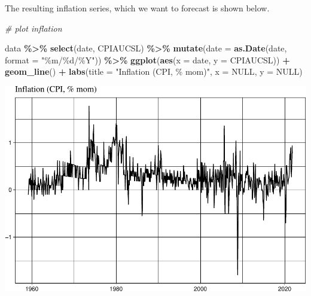 \documentclass[
]{article}
\newenvironment{Shaded}{\begin{snugshade}}{\end{snugshade}}
\newcommand{\AttributeTok}[1]{\textcolor[rgb]{0.13,0.29,0.53}{#1}}
\newcommand{\CommentTok}[1]{\textcolor[rgb]{0.56,0.35,0.01}{\textit{#1}}}
\newcommand{\ConstantTok}[1]{\textcolor[rgb]{0.56,0.35,0.01}{#1}}
\newcommand{\DecValTok}[1]{\textcolor[rgb]{0.00,0.00,0.81}{#1}}
\newcommand{\FunctionTok}[1]{\textcolor[rgb]{0.13,0.29,0.53}{\textbf{#1}}}
\newcommand{\NormalTok}[1]{#1}
\newcommand{\OtherTok}[1]{\textcolor[rgb]{0.56,0.35,0.01}{#1}}
\newcommand{\SpecialCharTok}[1]{\textcolor[rgb]{0.81,0.36,0.00}{\textbf{#1}}}
\newcommand{\StringTok}[1]{\textcolor[rgb]{0.31,0.60,0.02}{#1}}
\begin{document}
\begin{Shaded}
\end{Shaded}

The resulting inflation series, which we want to forecast is shown
below.

\begin{Shaded}
\begin{Highlighting}[]
\CommentTok{\# plot inflation}

\NormalTok{data }\SpecialCharTok{\%\textgreater{}\%}
    \FunctionTok{select}\NormalTok{(date, CPIAUCSL) }\SpecialCharTok{\%\textgreater{}\%}
    \FunctionTok{mutate}\NormalTok{(}\AttributeTok{date =} \FunctionTok{as.Date}\NormalTok{(date, }\AttributeTok{format =} \StringTok{"\%m/\%d/\%Y"}\NormalTok{)) }\SpecialCharTok{\%\textgreater{}\%}
    \FunctionTok{ggplot}\NormalTok{(}\FunctionTok{aes}\NormalTok{(}\AttributeTok{x =}\NormalTok{ date, }\AttributeTok{y =}\NormalTok{ CPIAUCSL)) }\SpecialCharTok{+} \FunctionTok{geom\_line}\NormalTok{() }\SpecialCharTok{+} \FunctionTok{labs}\NormalTok{(}\AttributeTok{title =} \StringTok{"Inflation (CPI, \% mom)"}\NormalTok{,}
    \AttributeTok{x =} \ConstantTok{NULL}\NormalTok{, }\AttributeTok{y =} \ConstantTok{NULL}\NormalTok{)}
\end{Highlighting}
\end{Shaded}

\includegraphics{Trabalho_Econo4_Q2_files/figure-latex/unnamed-chunk-5-1.pdf}
\end{document}

